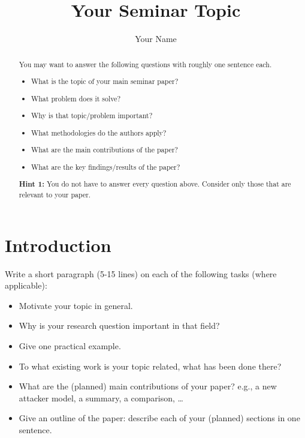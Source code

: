 \documentclass[sigconf]{acmart}
\begin{document}
\title{Your Seminar Topic}


\author{Your Name}

\renewcommand{\shortauthors}{Your Name}


\begin{abstract} %
  You may want to answer the following questions with roughly one sentence each.

  \begin{itemize}
  \item What is the topic of your main seminar paper?
  \item What problem does it solve?
  \item Why is that topic/problem important?
  \item What methodologies do the authors apply?
  \item What are the main contributions of the paper?
  \item What are the key findings/results of the paper?
  \end{itemize}
  
\textbf{Hint 1:} You do not have to answer every question above. Consider only those that are relevant to your paper. 

\end{abstract}

\maketitle

\section{Introduction}

Write a short paragraph (5-15 lines) on each of the following tasks (where applicable):
\begin{itemize}
\item Motivate your topic in general.
\item Why is your research question important in that field?
\item Give one practical example.
\item To what existing work is your topic related, what has been done there?
\item What are the (planned) main contributions of your paper? e.g., a
new attacker model, a summary, a comparison, \dots
\item Give an outline of the paper: describe each of your (planned)
sections in one sentence.
\end{itemize}
\end{document}
